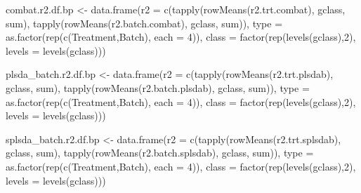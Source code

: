 \documentclass[
]{book}
\newenvironment{Shaded}{\begin{snugshade}}{\end{snugshade}}
\newcommand{\AttributeTok}[1]{\textcolor[rgb]{0.77,0.63,0.00}{#1}}
\newcommand{\DecValTok}[1]{\textcolor[rgb]{0.00,0.00,0.81}{#1}}
\newcommand{\FunctionTok}[1]{\textcolor[rgb]{0.00,0.00,0.00}{#1}}
\newcommand{\NormalTok}[1]{#1}
\newcommand{\OtherTok}[1]{\textcolor[rgb]{0.56,0.35,0.01}{#1}}
\newcommand{\StringTok}[1]{\textcolor[rgb]{0.31,0.60,0.02}{#1}}
\begin{document}
\begin{Shaded}
\begin{Highlighting}[]
\NormalTok{combat.r2.df.bp }\OtherTok{\textless{}{-}} 
  \FunctionTok{data.frame}\NormalTok{(}\AttributeTok{r2 =} \FunctionTok{c}\NormalTok{(}\FunctionTok{tapply}\NormalTok{(}\FunctionTok{rowMeans}\NormalTok{(r2.trt.combat), gclass, sum),}
                    \FunctionTok{tapply}\NormalTok{(}\FunctionTok{rowMeans}\NormalTok{(r2.batch.combat), gclass, sum)), }
             \AttributeTok{type =} \FunctionTok{as.factor}\NormalTok{(}\FunctionTok{rep}\NormalTok{(}\FunctionTok{c}\NormalTok{(}\StringTok{\textquotesingle{}Treatment\textquotesingle{}}\NormalTok{,}\StringTok{\textquotesingle{}Batch\textquotesingle{}}\NormalTok{), }\AttributeTok{each =} \DecValTok{4}\NormalTok{)),}
             \AttributeTok{class =} \FunctionTok{factor}\NormalTok{(}\FunctionTok{rep}\NormalTok{(}\FunctionTok{levels}\NormalTok{(gclass),}\DecValTok{2}\NormalTok{), }\AttributeTok{levels =} \FunctionTok{levels}\NormalTok{(gclass)))}

\NormalTok{plsda\_batch.r2.df.bp }\OtherTok{\textless{}{-}} 
  \FunctionTok{data.frame}\NormalTok{(}\AttributeTok{r2 =} \FunctionTok{c}\NormalTok{(}\FunctionTok{tapply}\NormalTok{(}\FunctionTok{rowMeans}\NormalTok{(r2.trt.plsdab), gclass, sum), }
                    \FunctionTok{tapply}\NormalTok{(}\FunctionTok{rowMeans}\NormalTok{(r2.batch.plsdab), gclass, sum)), }
             \AttributeTok{type =} \FunctionTok{as.factor}\NormalTok{(}\FunctionTok{rep}\NormalTok{(}\FunctionTok{c}\NormalTok{(}\StringTok{\textquotesingle{}Treatment\textquotesingle{}}\NormalTok{,}\StringTok{\textquotesingle{}Batch\textquotesingle{}}\NormalTok{), }\AttributeTok{each =} \DecValTok{4}\NormalTok{)),}
             \AttributeTok{class =} \FunctionTok{factor}\NormalTok{(}\FunctionTok{rep}\NormalTok{(}\FunctionTok{levels}\NormalTok{(gclass),}\DecValTok{2}\NormalTok{), }\AttributeTok{levels =} \FunctionTok{levels}\NormalTok{(gclass)))}

\NormalTok{splsda\_batch.r2.df.bp }\OtherTok{\textless{}{-}} 
  \FunctionTok{data.frame}\NormalTok{(}\AttributeTok{r2 =} \FunctionTok{c}\NormalTok{(}\FunctionTok{tapply}\NormalTok{(}\FunctionTok{rowMeans}\NormalTok{(r2.trt.splsdab), gclass, sum), }
                    \FunctionTok{tapply}\NormalTok{(}\FunctionTok{rowMeans}\NormalTok{(r2.batch.splsdab), gclass, sum)), }
             \AttributeTok{type =} \FunctionTok{as.factor}\NormalTok{(}\FunctionTok{rep}\NormalTok{(}\FunctionTok{c}\NormalTok{(}\StringTok{\textquotesingle{}Treatment\textquotesingle{}}\NormalTok{,}\StringTok{\textquotesingle{}Batch\textquotesingle{}}\NormalTok{), }\AttributeTok{each =} \DecValTok{4}\NormalTok{)),}
             \AttributeTok{class =} \FunctionTok{factor}\NormalTok{(}\FunctionTok{rep}\NormalTok{(}\FunctionTok{levels}\NormalTok{(gclass),}\DecValTok{2}\NormalTok{), }\AttributeTok{levels =} \FunctionTok{levels}\NormalTok{(gclass)))}



\end{Highlighting}
\end{Shaded}
\end{document}
